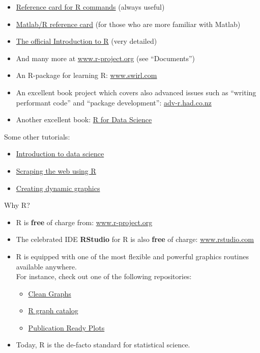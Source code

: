 \documentclass[
  letterpaper,
  DIV=11,
  numbers=noendperiod]{scrreprt}
\providecommand{\tightlist}{%
  \setlength{\itemsep}{0pt}\setlength{\parskip}{0pt}}\usepackage{longtable,booktabs,array}
\theoremstyle{definition}
\theoremstyle{plain}
\theoremstyle{plain}
\theoremstyle{remark}
\begin{document}
\begin{itemize}
\tightlist
\item
  \href{http://cran.r-project.org/doc/contrib/refcard.pdf}{Reference
  card for R commands} (always useful)
\item
  \href{http://www.math.umaine.edu/~hiebeler/comp/matlabR.pdf}{Matlab/R
  reference card} (for those who are more familiar with Matlab)
\item
  \href{https://cran.r-project.org/doc/manuals/r-release/R-intro.pdf}{The
  official Introduction to R} (very detailed)
\item
  And many more at
  \href{https://www.r-project.org/other-docs.html}{www.r-project.org}
  (see ``Documents'')
\item
  An R-package for learning R:
  \href{https://swirlstats.com/}{www.swirl.com}
\item
  An excellent book project which covers also advanced issues such as
  ``writing performant code'' and ``package development'':
  \href{http://adv-r.had.co.nz/}{adv-r.had.co.nz}\\
\item
  Another excellent book: \href{https://r4ds.had.co.nz/}{R for Data
  Science}
\end{itemize}

Some other tutorials:

\begin{itemize}
\tightlist
\item
  \href{https://idc9.github.io/stor390/}{Introduction to data science}
\item
  \href{https://stat4701.github.io/edav/2015/04/02/rvest_tutorial/}{Scraping
  the web using R}
\item
  \href{https://gganimate.com/}{Creating dynamic graphics}
\end{itemize}

Why R?

\begin{itemize}
\tightlist
\item
  R is \textbf{free} of charge from:
  \href{https://www.r-project.org/}{www.r-project.org}
\item
  The celebrated IDE \textbf{RStudio} for R is also \textbf{free} of
  charge: \href{http://www.rstudio.com/}{www.rstudio.com}
\item
  R is equipped with one of the most flexible and powerful graphics
  routines available anywhere.\\
  For instance, check out one of the following repositories:

  \begin{itemize}
  \tightlist
  \item
    \href{http://shinyapps.org/apps/RGraphCompendium/index.php}{Clean
    Graphs}
  \item
    \href{http://shiny.stat.ubc.ca/r-graph-catalog/}{R graph catalog}
  \item
    \href{http://www.sthda.com/english/rpkgs/ggpubr/}{Publication Ready
    Plots}
  \end{itemize}
\item
  Today, R is the de-facto standard for statistical science.
\end{itemize}
\end{document}
